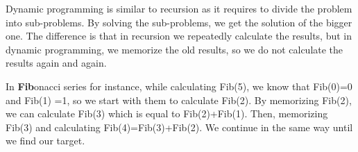 
Dynamic programming is similar to recursion as it requires to divide the problem into sub-problems. By solving the sub-problems, we get the solution of the bigger one. The difference is that in recursion we repeatedly calculate the results, but in dynamic programming, we memorize the old results, so we do not calculate the results again and again.

In \textbf{Fib}onacci series for instance, while calculating Fib(5), we know that Fib(0)=0 and Fib(1) =1, so we start with them to calculate Fib(2). By memorizing Fib(2), we can calculate Fib(3) which is equal to Fib(2)+Fib(1). Then, memorizing Fib(3) and calculating Fib(4)=Fib(3)+Fib(2). We continue in the same way until we find our target.

